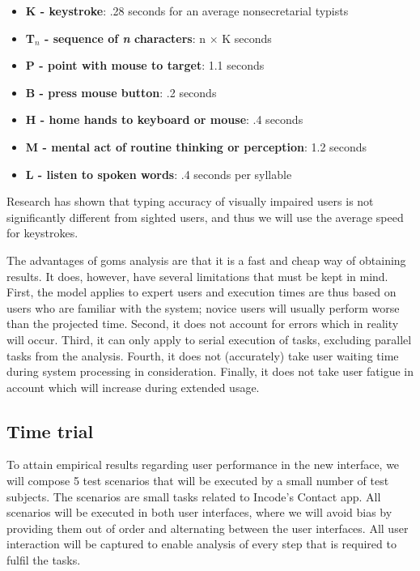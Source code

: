 \begin{itemize}
	\item \textbf{K - keystroke}: .28 seconds for an average nonsecretarial typists
	\item \textbf{T$_n$ - sequence of \textit{n} characters}: n $\times$ K seconds
	\item \textbf{P - point with mouse to target}: 1.1 seconds
	\item \textbf{B - press mouse button}: .2 seconds
	\item \textbf{H - home hands to keyboard or mouse}: .4 seconds
	\item \textbf{M - mental act of routine thinking or perception}: 1.2 seconds
	\item \textbf{L - listen to spoken words}: .4 seconds per syllable
\end{itemize}

Research has shown that typing accuracy of visually impaired users is not significantly different from sighted users\cite{ishida1993accuracy}, and thus we will use the average speed for keystrokes.

The advantages of \acrshort{goms} analysis are that it is a fast and cheap way of obtaining results. It does, however, have several limitations that must be kept in mind\cite{schrepp1990goms}. First, the model applies to expert users and execution times are thus based on users who are familiar with the system; novice users will usually perform worse than the projected time. Second, it does not account for errors which in reality will occur. Third, it can only apply to serial execution of tasks, excluding parallel tasks from the analysis. Fourth, it does not (accurately) take user waiting time during system processing in consideration. Finally, it does not take user fatigue in account which will increase during extended usage.

\subsection{Time trial}
\label{subsection:timetrial_methods}
To attain empirical results regarding user performance in the new interface, we will compose 5 test scenarios that will be executed by a small number of test subjects. The scenarios are small tasks related to Incode's Contact app\cite{incod72:online}. All scenarios will be executed in both user interfaces, where we will avoid bias by providing them out of order and alternating between the user interfaces\cite{chen2007comparing}. All user interaction will be captured to enable analysis of every step that is required to fulfil the tasks.

